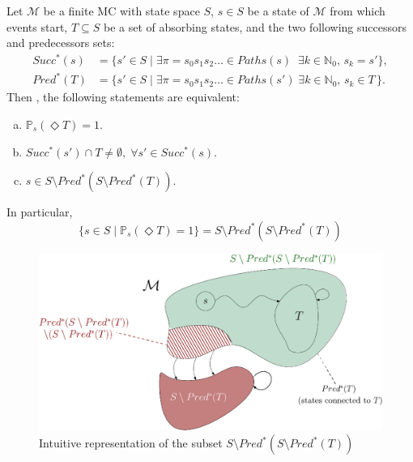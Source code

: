 \begin{theorem}\label{asr}
  Let $\mathcal{M}$ be a finite MC with state space $S$, $s \in S$ be a state of $\mathcal{M}$ from which events start, $T \subseteq S$ be a set of absorbing states, and the two following successors and predecessors sets:
\begin{align*}
  Succ^*(s) &= \{ s' \in S \; | \; \exists \pi = s_0s_1s_2\dots \in Paths(s) \;\; \exists k \in \mathbb{N}_0, \, s_k = s' \}, \\
  Pred^*(T) &= \{ s' \in S \; | \; \exists \pi = s_0s_1s_2\dots \in Paths(s')\; \exists k \in \mathbb{N}_0, \, s_{k} \in T \,\}.
\end{align*}
   Then , the following statements are equivalent:
  \begin{enumerate}[(a)]
    \item $\mathbb{P}_s(\Diamond T)= 1$. \label{succ1}
    \item $Succ^*(s') \cap T \neq \emptyset, \; \forall s' \in Succ^*(s)$.\label{succ2}
    \item $s \in S \setminus Pred^*(S \setminus Pred^*(T))$. \label{succ3}
  \end{enumerate}
  In particular, \[
  \{s \in S \; | \; \mathbb{P}_s(\Diamond T) = 1\} =
  S \setminus Pred^*(S \setminus Pred^*(T))
  \]
  \begin{figure}[h]
  \centering
  \includegraphics[width=0.8\linewidth]{resources/S1BSCC}
  \caption{Intuitive representation of the subset $S \setminus Pred^*(S \setminus Pred^*(T))$}\label{spred}
  \end{figure}
\end{theorem}
